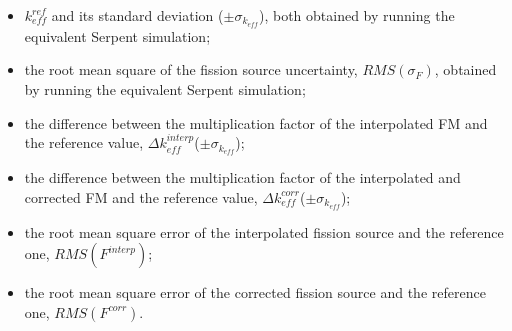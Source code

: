\documentclass[letterpaper]{physor2026}
\begin{document}
\begin{itemize}
    \item $k_{eff}^{ref}$ and its standard deviation ($\pm\sigma_{k_{eff}}$), both obtained by running the equivalent Serpent simulation;

    \item the root mean square of the fission source uncertainty, $RMS(\sigma_F)$, obtained by running the equivalent Serpent simulation;
    
    \item the difference between the multiplication factor of the interpolated FM and the reference value, $\Delta k_{eff}^{interp}$($\pm\sigma_{k_{eff}}$);
    
    \item the difference between the multiplication factor of the interpolated and corrected FM and the reference value, $\Delta k_{eff}^{corr}$($\pm\sigma_{k_{eff}}$);
    
    \item the root mean square error of the interpolated fission source and the reference one, $RMS(F^{interp})$;

    \item the root mean square error of the corrected fission source and the reference one, $RMS(F^{corr})$.
    
\end{itemize}
\end{document}
